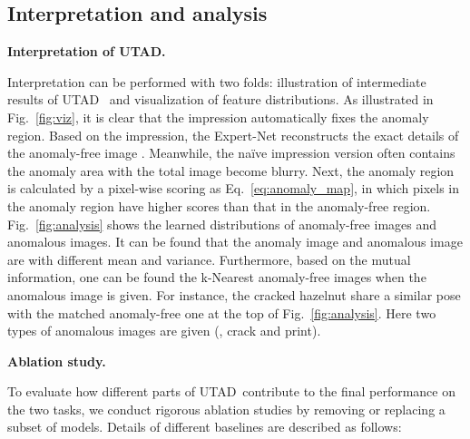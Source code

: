 \documentclass[final]{cvpr}
\newcommand{\eq}{Eq.}
\newcommand{\proposed}{UTAD}
\begin{document}
\subsection{Interpretation and analysis}

\noindent\textbf{Interpretation of \proposed.}

Interpretation can be performed with two folds: illustration of intermediate results of \proposed~ and visualization of feature distributions.
As illustrated in Fig.~\ref{fig:viz}, it is clear that the impression  automatically fixes the anomaly region. Based on the impression, the Expert-Net reconstructs the exact details of the anomaly-free image . Meanwhile, the na\"ive impression version  often contains the anomaly area with the total image become blurry. Next, the anomaly region  is calculated by a pixel-wise scoring as \eq~\eqref{eq:anomaly_map}, in which pixels in the anomaly region have higher scores than that in the anomaly-free region. 
Fig.~\ref{fig:analysis} shows the learned distributions of anomaly-free images and anomalous images. It can be found that the anomaly image and anomalous image are with different mean and variance. Furthermore, based on the mutual information, one can be found the k-Nearest anomaly-free images when the anomalous image is given. For instance, the cracked hazelnut share a similar pose with the matched anomaly-free one at the top of Fig.~\ref{fig:analysis}. Here two types of anomalous images are given (\ie, crack and print).

\noindent\textbf{Ablation study.}

To evaluate how different parts of \proposed~contribute to the final performance on the two tasks, we conduct rigorous ablation studies by removing or replacing a subset of models. Details of different baselines are described as follows:
	
\end{document}
